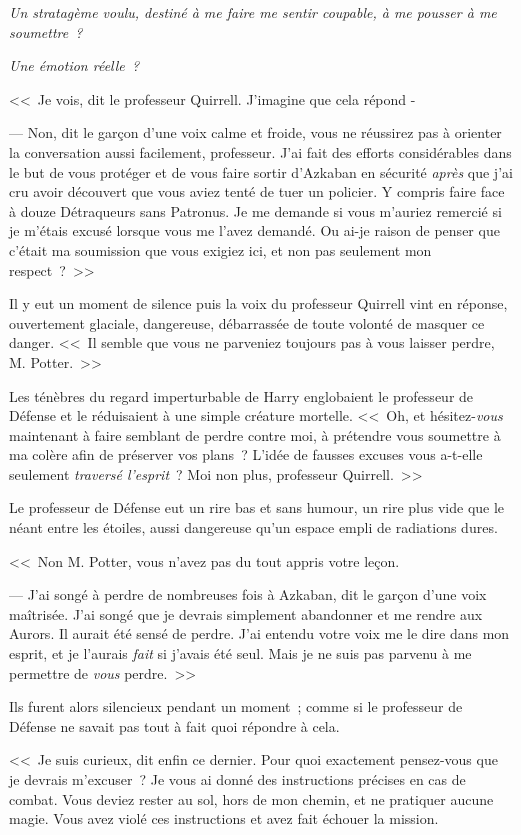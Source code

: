 \emph{Un stratagème voulu, destiné à me faire me sentir coupable, à me pousser à me soumettre~?}

\emph{Une émotion réelle~?}

<<~Je vois, dit le professeur Quirrell. J'imagine que cela répond -

--- Non, dit le garçon d'une voix calme et froide, vous ne réussirez pas à orienter la conversation aussi facilement, professeur. J'ai fait des efforts considérables dans le but de vous protéger et de vous faire sortir d'Azkaban en sécurité \emph{après} que j'ai cru avoir découvert que vous aviez tenté de tuer un policier. Y compris faire face à douze Détraqueurs sans Patronus. Je me demande si vous m'auriez remercié si je m'étais excusé lorsque vous me l'avez demandé. Ou ai-je raison de penser que c'était ma soumission que vous exigiez ici, et non pas seulement mon respect~?~>>

Il y eut un moment de silence puis la voix du professeur Quirrell vint en réponse, ouvertement glaciale, dangereuse, débarrassée de toute volonté de masquer ce danger. <<~Il semble que vous ne parveniez toujours pas à vous laisser perdre, M. Potter.~>>

Les ténèbres du regard imperturbable de Harry englobaient le professeur de Défense et le réduisaient à une simple créature mortelle. <<~Oh, et hésitez-\emph{vous} maintenant à faire semblant de perdre contre moi, à prétendre vous soumettre à ma colère afin de préserver vos plans~? L'idée de fausses excuses vous a-t-elle seulement \emph{traversé l'esprit}~? Moi non plus, professeur Quirrell.~>>

Le professeur de Défense eut un rire bas et sans humour, un rire plus vide que le néant entre les étoiles, aussi dangereuse qu'un espace empli de radiations dures.

<<~Non M. Potter, vous n'avez pas du tout appris votre leçon.

--- J'ai songé à perdre de nombreuses fois à Azkaban, dit le garçon d'une voix maîtrisée. J'ai songé que je devrais simplement abandonner et me rendre aux Aurors. Il aurait été sensé de perdre. J'ai entendu votre voix me le dire dans mon esprit, et je l'aurais \emph{fait} si j'avais été seul. Mais je ne suis pas parvenu à me permettre de \emph{vous} perdre.~>>

Ils furent alors silencieux pendant un moment~; comme si le professeur de Défense ne savait pas tout à fait quoi répondre à cela.

<<~Je suis curieux, dit enfin ce dernier. Pour quoi exactement pensez-vous que je devrais m'excuser~? Je vous ai donné des instructions précises en cas de combat. Vous deviez rester au sol, hors de mon chemin, et ne pratiquer aucune magie. Vous avez violé ces instructions et avez fait échouer la mission.

